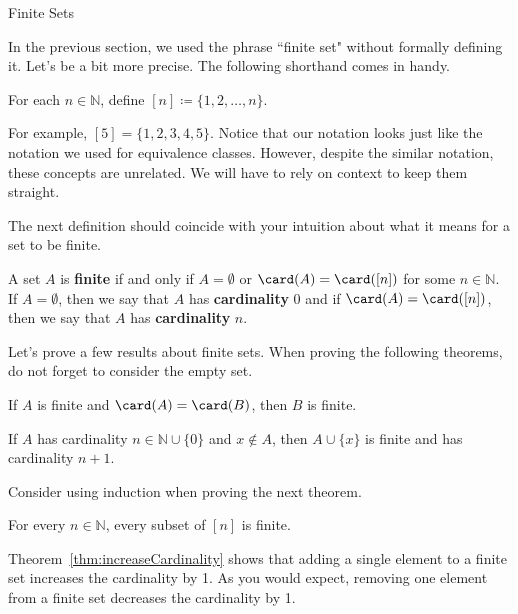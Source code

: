 \begin{section}{Finite Sets}

In the previous section, we used the phrase ``finite set" without formally defining it. Let's be a bit more precise. The following shorthand comes in handy.

\begin{definition}
For each $n\in \mathbb{N}$, define $\boxed{[n]\coloneqq \{1,2,\ldots,n\}}$.
\end{definition}

For example, $[5]=\{1,2,3,4,5\}$.  Notice that our notation looks just like the notation we used for equivalence classes. However, despite the similar notation, these concepts are unrelated. We will have to rely on context to keep them straight.

The next definition should coincide with your intuition about what it means for a set to be finite.

\begin{definition}
A set $A$ is \textbf{finite} if and only if $A=\emptyset$ or $\card(A)=\card([n])$ for some $n\in\mathbb{N}$. If $A=\emptyset$, then we say that $A$ has \textbf{cardinality} 0 and if $\card(A)=\card([n])$, then we say that $A$ has \textbf{cardinality} $n$.
\end{definition}

Let's prove a few results about finite sets. When proving the following theorems, do not forget to consider the empty set.

\begin{theorem}\label{thm:finiteSetsSameCardinality}
If $A$ is finite and $\card(A)=\card(B)$, then $B$ is finite.%
\end{theorem}

\begin{theorem}\label{thm:increaseCardinality}
If $A$ has cardinality $n\in\mathbb{N}\cup\{0\}$ and $x\notin A$, then $A\cup\{x\}$ is finite and has cardinality $n+1$.
\end{theorem}

Consider using induction when proving the next theorem.

\begin{theorem}\label{thm:subsetsFiniteSets}
For every $n\in\mathbb{N}$, every subset of $[n]$ is finite.
\end{theorem}

Theorem~\ref{thm:increaseCardinality} shows that adding a single element to a finite set increases the cardinality by 1. As you would expect, removing one element from a finite set decreases the cardinality by 1.


\end{section}
